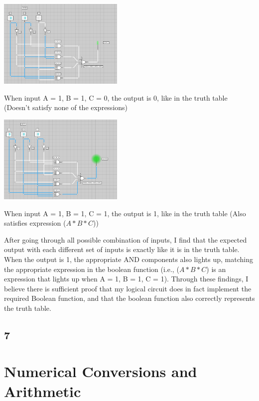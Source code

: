 \documentclass{article}
\begin{document}
    \includegraphics*[width=0.45\textwidth]{circuit7.png}

    \small When input A = 1, B = 1, C = 0, the output is 0, like in the truth table (Doesn't satisfy none of the expressions)

    \vspace*{0.1in}

    \includegraphics*[width=0.45\textwidth]{circuit8.png}

    \small When input A = 1, B = 1, C = 1, the output is 1, like in the truth table (Also satisfies expression ($A*B*C$))

    \vspace*{0.2in}

    After going through all possible combination of inputs, I find that the expected output with each different set of inputs is exactly like it is in the truth table. When the output is 1, the appropriate AND components also lights up, matching the appropriate expression in the boolean function (i.e., ($A*B*C$) is an expression that lights up when A = 1, B = 1, C = 1). Through these findings, I believe there is sufficient proof that my logical circuit does in fact implement the required Boolean function, and that the boolean function also correctly represents the truth table.

    \subsection*{7}

    \newpage

    \section*{Numerical Conversions and Arithmetic}
\end{document}
